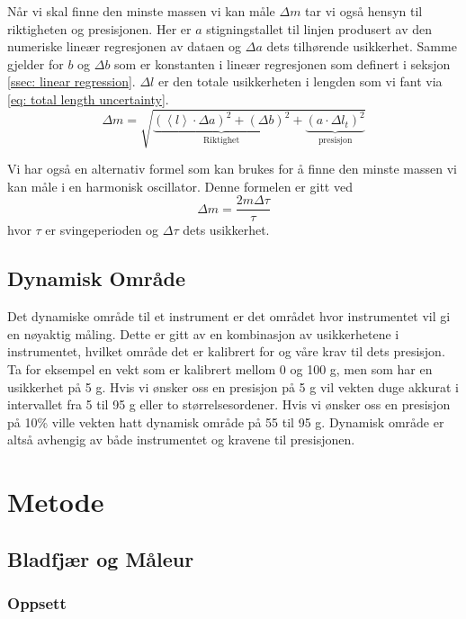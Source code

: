 \documentclass[reprint,norsk,notitlepage]{revtex4-2}
\begin{document}
Når vi skal finne den minste massen vi kan måle $Δm$ tar vi også hensyn til riktigheten og presisjonen. Her er $a$ stigningstallet til linjen produsert av den numeriske lineær regresjonen av dataen og $Δa$ dets tilhørende usikkerhet. Samme gjelder for $b$ og $Δb$ som er konstanten i lineær regresjonen som definert i seksjon \ref{ssec: linear regression}. $Δl$ er den totale usikkerheten i lengden som vi fant via \cref{eq: total length uncertainty}.
\begin{equation}\label{eq: mass uncertainty}
    Δm = \sqrt{\underbrace{\left(\left<l\right> ⋅ Δa\right)^2 + \left(Δb\right)^2}_{\text{Riktighet}} + \underbrace{\left(a ⋅ Δl_t\right)^2}_{\text{presisjon}}}  
\end{equation}

Vi har også en alternativ formel som kan brukes for å finne den minste massen vi kan måle i en harmonisk oscillator. Denne formelen er gitt ved
\begin{equation}\label{eq: mass uncertainty alternative}
    Δm = \frac{2mΔτ}{τ}  
\end{equation}
hvor $τ$ er svingeperioden og $Δτ$ dets usikkerhet. 

\subsection{Dynamisk Område}
Det dynamiske område til et instrument er det området hvor instrumentet vil gi en nøyaktig måling. Dette er gitt av en kombinasjon av usikkerhetene i instrumentet, hvilket område det er kalibrert for og våre krav til dets presisjon. Ta for eksempel en vekt som er kalibrert mellom 0 og 100 g, men som har en usikkerhet på 5 g. Hvis vi ønsker oss en presisjon på 5 g vil vekten duge akkurat i intervallet fra 5 til 95 g eller to størrelsesordener. Hvis vi ønsker oss en presisjon på 10\% ville vekten hatt dynamisk område på 55 til 95 g. Dynamisk område er altså avhengig av både instrumentet og kravene til presisjonen.
  
\section{Metode} \label{sec: method} 
\subsection{Bladfjær og Måleur}
\subsubsection{Oppsett} \label{ssec: setup maaleur}
\end{document}
